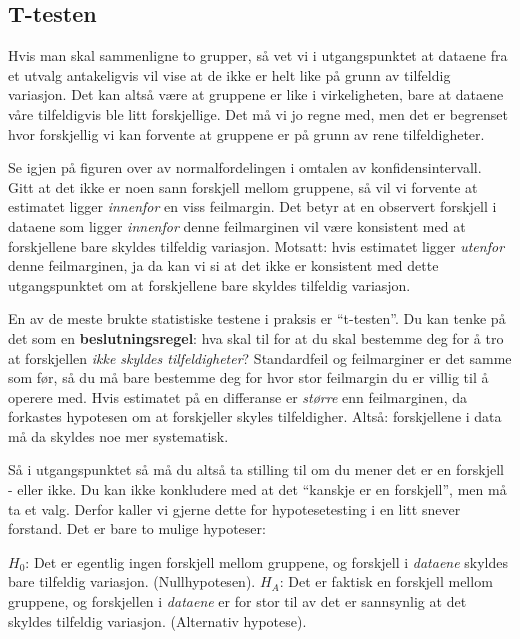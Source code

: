 \documentclass[
  letterpaper,
  DIV=11,
  numbers=noendperiod]{scrreprt}
\theoremstyle{definition}
\theoremstyle{remark}
\begin{document}
\hypertarget{t-testen}{%
\subsection{T-testen}\label{t-testen}}

Hvis man skal sammenligne to grupper, så vet vi i utgangspunktet at
dataene fra et utvalg antakeligvis vil vise at de ikke er helt like på
grunn av tilfeldig variasjon. Det kan altså være at gruppene er like i
virkeligheten, bare at dataene våre tilfeldigvis ble litt forskjellige.
Det må vi jo regne med, men det er begrenset hvor forskjellig vi kan
forvente at gruppene er på grunn av rene tilfeldigheter.

Se igjen på figuren over av normalfordelingen i omtalen av
konfidensintervall. Gitt at det ikke er noen sann forskjell mellom
gruppene, så vil vi forvente at estimatet ligger \emph{innenfor} en viss
feilmargin. Det betyr at en observert forskjell i dataene som ligger
\emph{innenfor} denne feilmarginen vil være konsistent med at
forskjellene bare skyldes tilfeldig variasjon. Motsatt: hvis estimatet
ligger \emph{utenfor} denne feilmarginen, ja da kan vi si at det ikke er
konsistent med dette utgangspunktet om at forskjellene bare skyldes
tilfeldig variasjon.

En av de meste brukte statistiske testene i praksis er ``t-testen''. Du
kan tenke på det som en \textbf{beslutningsregel}: hva skal til for at
du skal bestemme deg for å tro at forskjellen \emph{ikke skyldes
tilfeldigheter}? Standardfeil og feilmarginer er det samme som før, så
du må bare bestemme deg for hvor stor feilmargin du er villig til å
operere med. Hvis estimatet på en differanse er \emph{større} enn
feilmarginen, da forkastes hypotesen om at forskjeller skyles
tilfeldigher. Altså: forskjellene i data må da skyldes noe mer
systematisk.

Så i utgangspunktet så må du altså ta stilling til om du mener det er en
forskjell - eller ikke. Du kan ikke konkludere med at det ``kanskje er
en forskjell'', men må ta et valg. Derfor kaller vi gjerne dette for
hypotesetesting i en litt snever forstand. Det er bare to mulige
hypoteser:

\(H_0\): Det er egentlig ingen forskjell mellom gruppene, og forskjell i
\emph{dataene} skyldes bare tilfeldig variasjon. (Nullhypotesen).
\(H_A\): Det er faktisk en forskjell mellom gruppene, og forskjellen i
\emph{dataene} er for stor til av det er sannsynlig at det skyldes
tilfeldig variasjon. (Alternativ hypotese).
\end{document}
